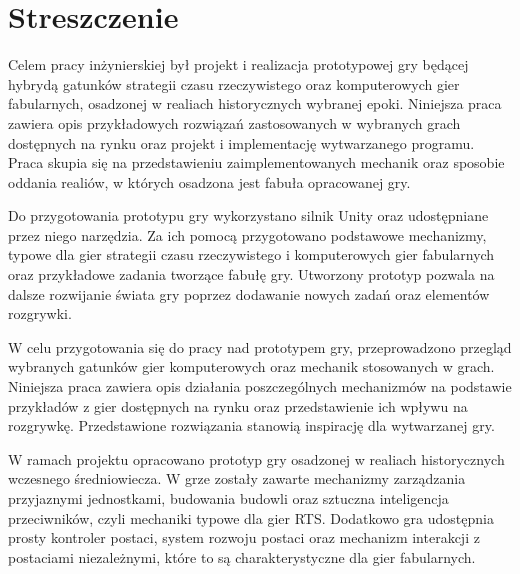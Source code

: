\chapter*{Streszczenie}
Celem pracy inżynierskiej był projekt i realizacja prototypowej gry będącej hybrydą gatunków strategii czasu rzeczywistego oraz
komputerowych gier fabularnych, osadzonej w realiach historycznych
wybranej epoki. Niniejsza praca zawiera opis przykładowych rozwiązań zastosowanych w wybranych grach dostępnych na rynku
oraz projekt i implementację wytwarzanego programu. Praca skupia się na przedstawieniu zaimplementowanych mechanik oraz
sposobie oddania realiów, w których osadzona jest fabuła opracowanej gry.

Do przygotowania prototypu gry wykorzystano silnik Unity oraz udostępniane przez niego narzędzia. Za ich pomocą
przygotowano podstawowe mechanizmy, typowe dla gier strategii czasu rzeczywistego i komputerowych gier fabularnych oraz przykładowe zadania tworzące
fabułę gry. Utworzony prototyp pozwala na dalsze rozwijanie świata gry poprzez dodawanie nowych zadań oraz elementów
rozgrywki.

W celu przygotowania się do pracy nad prototypem gry, przeprowadzono przegląd wybranych gatunków gier komputerowych oraz
mechanik stosowanych w grach. Niniejsza praca zawiera opis działania poszczególnych mechanizmów na podstawie przykładów
z gier dostępnych na rynku oraz przedstawienie ich wpływu na rozgrywkę. Przedstawione rozwiązania stanowią inspirację dla wytwarzanej gry.

W ramach projektu opracowano prototyp gry osadzonej w realiach historycznych wczesnego średniowiecza. W grze zostały
zawarte mechanizmy zarządzania przyjaznymi jednostkami, budowania budowli oraz sztuczna inteligencja przeciwników, czyli
mechaniki typowe dla gier RTS. Dodatkowo gra udostępnia prosty kontroler postaci, system rozwoju postaci oraz mechanizm
interakcji z postaciami niezależnymi, które to są charakterystyczne dla gier fabularnych.

